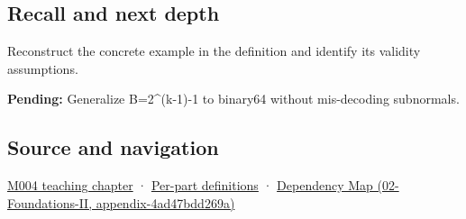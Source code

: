 \subsection{Recall and next depth}\label{recall-and-next-depth}

Reconstruct the concrete example in the definition and identify its validity assumptions.

\textbf{Pending:} Generalize B=2\^{}(k-1)-1 to binary64 without mis-decoding subnormals.

\subsection{Source and navigation}\label{source-and-navigation}

\href{Continuous\%20Notes/Computing\%20Foundations\%20-\%20From\%20Bits\%20to\%20C++\%20and\%20Systems\%20APIs\#A\%20stretching\%20ruler\%20for\%20real-valued\%20quantities}{M004 teaching chapter} · \hyperref[appendix-fd090d982a15]{Per-part definitions} · \href{}{Dependency Map (02-Foundations-II, appendix-4ad47bdd269a)}
